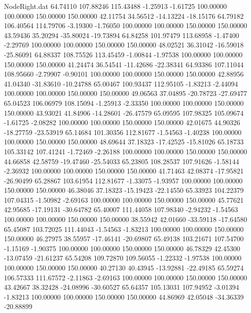 \begin{filecontents}{NodeRight.dat}
  64.74110  107.88246  115.43488    -1.25913   -1.61725  100.00000  100.00000  150.00000  150.00000   42.11754   34.56512  -14.13224  -18.15176
  64.79182  106.40564  114.79706    -3.19300   -1.76050  100.00000  100.00000  150.00000  150.00000   43.59436   35.20294  -35.80024  -19.73894
  64.84258  101.97479  113.68958    -1.47400   -2.29769  100.00000  100.00000  150.00000  150.00000   48.02521   36.31042  -16.59018  -25.86091
  64.88337  108.75526  113.45459    -1.00844   -1.97538  100.00000  100.00000  150.00000  150.00000   41.24474   36.54541  -11.42686  -22.38341
  64.93386  107.11044  108.95660    -2.79907   -0.90101  100.00000  100.00000  150.00000  150.00000   42.88956   41.04340  -31.83610  -10.24788
  65.00467  100.93437  112.95105    -1.83213   -2.44094  100.00000  100.00000  150.00000  150.00000   49.06563   37.04895  -20.78723  -27.69477
  65.04523  106.06979  108.15094    -1.25913   -2.33350  100.00000  100.00000  150.00000  150.00000   43.93021   41.84906  -14.28601  -26.47579
  65.09595  107.98325  105.09674    -1.61725   -2.08282  100.00000  100.00000  150.00000  150.00000   42.01675   44.90326  -18.27759  -23.53919
  65.14684  101.30356  112.81677    -1.54563   -1.40238  100.00000  100.00000  150.00000  150.00000   48.69644   37.18323  -17.42525  -15.81026
  65.18733  105.33142  107.41241    -1.72469   -2.26188  100.00000  100.00000  150.00000  150.00000   44.66858   42.58759  -19.47460  -25.54033
  65.23805  108.28537  107.91626    -1.58144   -2.36932  100.00000  100.00000  150.00000  150.00000   41.71463   42.08374  -17.95821  -26.90499
  65.28867  103.61954  112.81677    -1.33075   -1.93957  100.00000  100.00000  150.00000  150.00000   46.38046   37.18323  -15.19423  -22.14550
  65.33923  104.22379  107.04315    -1.50982   -2.69163  100.00000  100.00000  150.00000  150.00000   45.77621   42.95685  -17.19131  -30.64782
  65.40007  111.44058  107.98340    -2.94232   -1.54563  100.00000  100.00000  150.00000  150.00000   38.55942   42.01660  -33.59118  -17.64580
  65.45087  103.72025  111.44043    -1.54563   -1.83213  100.00000  100.00000  150.00000  150.00000   46.27975   38.55957  -17.46141  -20.69807
  65.49138  103.21671  107.54700    -1.15169   -1.90375  100.00000  100.00000  150.00000  150.00000   46.78329   42.45300  -13.07459  -21.61237
  65.54208  109.72870  109.56055    -1.22332   -1.97538  100.00000  100.00000  150.00000  150.00000   40.27130   40.43945  -13.92881  -22.49185
  65.59274  106.57333  111.67572    -2.11863   -2.69163  100.00000  100.00000  150.00000  150.00000   43.42667   38.32428  -24.08996  -30.60527
  65.64357  105.13031  107.94952    -3.01394   -1.83213  100.00000  100.00000  150.00000  150.00000   44.86969   42.05048  -34.36339  -20.88899

\end{filecontents}
